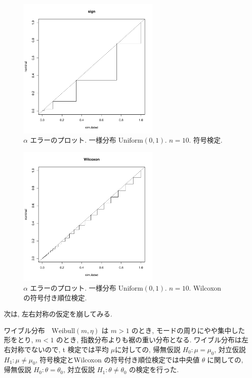\documentclass[12pt]{jsarticle}
\begin{document}
 \begin{figure}[htbp]
 \begin{center}
  \includegraphics[width=70mm]{img/pv_unif_10_sign.pdf}
 \end{center}
      \caption{$\alpha$ エラーのプロット. 一様分布 $\mathrm{Uniform}(0,1)$. $n=10$. 符号検定.}
     \end{figure}  

 \begin{figure}[htbp]
 \begin{center}
  \includegraphics[width=70mm]{img/pv_unif_10_wilco.pdf}
 \end{center}
       \caption{$\alpha$ エラーのプロット. 一様分布 $\mathrm{Uniform}(0,1)$. $n=10$. Wilcoxon の符号付き順位検定.}
  \label{fig_pv_unif_10_wilco}
\end{figure}

次は, 左右対称の仮定を崩してみる. 

ワイブル分布　$\mathrm{Weibull}(m ,\eta)$ は $m>1$ のとき, モードの周りにやや集中した形をとり, $m < 1$ のとき, 指数分布よりも裾の重い分布となる. 
ワイブル分布は左右対称でないので, t 検定では平均 $\mu$に対しての, 帰無仮説 $H_0: \mu = \mu_0$, 対立仮説 $H_1: \mu \neq \mu_0$, 符号検定とWilcoxon の符号付き順位検定では中央値 $\theta$ に関しての, 帰無仮説 $H_0: \theta = \theta_0$, 対立仮説 $H_1: \theta \neq \theta_0$ の検定を行った. 
\end{document}

